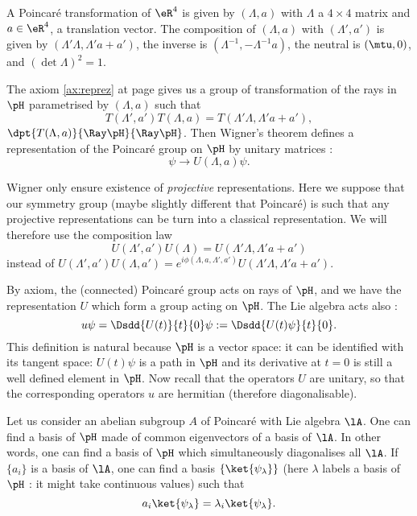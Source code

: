 A Poincaré transformation of $\eR^4$ is given by $(\Lambda,a)$ with $\Lambda$ a $4\times 4$ matrix and $a\in\eR^4$, a translation vector. The composition of $(\Lambda,a)$ with $(\Lambda',a')$ is given by $(\Lambda'\Lambda,\Lambda'a+a')$, the inverse is $(\Lambda^{-1},-\Lambda^{-1} a)$, the neutral is $(\mtu,0)$, and $(\det\Lambda)^2=1$.

The axiom \ref{ax:reprez} at page \pageref{pg:axiomes} gives us a group of transformation of the rays in $\pH$ parametrised by $(\Lambda,a)$ such that
\begin{equation}
  T(\Lambda',a')T(\Lambda,a)=T(\Lambda'\Lambda,\Lambda'a+a'),
\end{equation}
$\dpt{T(\Lambda,a)}{\Ray \pH}{\Ray \pH}$. Then Wigner's theorem defines a representation of the Poincaré group on $\pH$ by unitary matrices :
\[
\psi\to U(\Lambda,a)\psi.
\]

\begin{remark}
Wigner only ensure existence of \emph{projective} representations. Here we suppose that our symmetry group (maybe slightly different that Poincaré) is such that any projective representations can be turn into a classical representation. We will therefore use the composition law
\begin{equation}\label{eq:composition_U}
  U(\Lambda',a')U(\Lambda)=U(\Lambda'\Lambda,\Lambda'a+a')
\end{equation}
instead of $U(\Lambda',a')U(\Lambda,a')=e^{i\phi(\Lambda,a,\Lambda',a')}U(\Lambda'\Lambda,\Lambda'a+a')$.
\end{remark}

By axiom, the (connected) Poincaré group acts on rays of $\pH$, and we have the representation $U$ which form a group acting on $\pH$. The Lie algebra acts also :
\begin{equation}
u\psi=\Dsdd{U(t)}{t}{0}\psi:=\Dsdd{U(t)\psi}{t}{0}.
\end{equation}
This definition is natural because $\pH$ is a vector space: it can be identified with its tangent space: $U(t)\psi$ is a path in $\pH$ and its derivative at $t=0$ is still a well defined element in $\pH$. Now recall that the operators $U$ are unitary, so that the corresponding operators $u$ are hermitian (therefore diagonalisable).

Let us consider an abelian subgroup $A$ of Poincaré with Lie algebra $\lA$. One can find a basis of $\pH$ made of common eigenvectors of a basis of $\lA$. In other words, one can find a basis of $\pH$ which simultaneously diagonalises all $\lA$. If $\{a_i\}$ is a basis of $\lA$, one can find a basis $\{\ket{\psi_{\lambda}}\}$ (here $\lambda$ labels a basis of $\pH$ : it might take continuous values) such that
\begin{equation}
   a_i\ket{\psi_{\lambda}}=\lambda_i\ket{\psi_{\lambda}}.
\end{equation}

